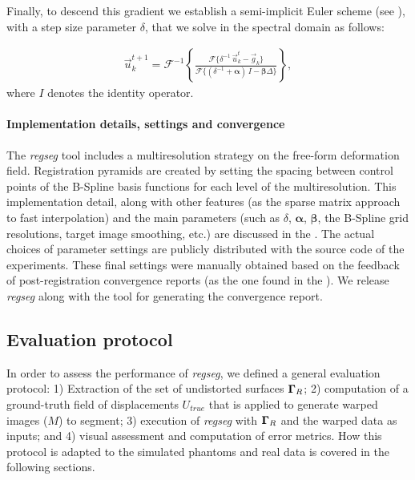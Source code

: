 Finally, to descend this gradient we establish a semi-implicit Euler scheme (see ),
  with a step size parameter $\delta$, that we solve in the spectral domain as follows:

  \begin{align}
  \vec{u}_k^{t+1} = \mathcal{F}^{-1}\left\{ \frac{\mathcal{F}\{\delta^{-1} \, \vec{u}_k^t - \vec{g}_k\} }%
                  {\mathcal{F}\{(\delta^{-1} + \boldsymbol{\alpha})\, I - \boldsymbol{\beta}\Delta\}} \right\},
  \label{eq:update_equation}
  \end{align}
  where $I$ denotes the identity operator.


\paragraph*{Implementation details, settings and convergence}
\label{sec:conv_report}
The \emph{regseg} tool includes a multiresolution strategy on the free-form deformation field.
Registration pyramids are created by setting the spacing between control points of the B-Spline basis
  functions for each level of the multiresolution.
This implementation detail, along with other features (as the sparse matrix approach
  to fast interpolation) and the main parameters 
  (such as $\delta$, $\boldsymbol{\alpha}$, $\boldsymbol{\beta}$, the B-Spline grid resolutions,
  target image smoothing, etc.) are discussed in the .
The actual choices of parameter settings are publicly distributed with the source code of the experiments.
These final settings were manually obtained based on the feedback of post-registration convergence
  reports (as the one found in the ).
We release \emph{regseg} along with the tool for generating the convergence report.

\subsection{Evaluation protocol}\label{sec:evaluation_protocol}
In order to assess the performance of \emph{regseg}, we defined a general
  evaluation protocol:
1) Extraction of the set of undistorted surfaces $\boldsymbol{\Gamma}_R$;
2) computation of a ground-truth field of displacements $U_{true}$ that is applied to
  generate warped images ($M$) to segment;
3) execution of \emph{regseg} with $\boldsymbol{\Gamma}_R$ and the warped data as inputs; and
4) visual assessment and computation of error metrics.
How this protocol is adapted to the simulated phantoms and real data is covered in the
  following sections.

